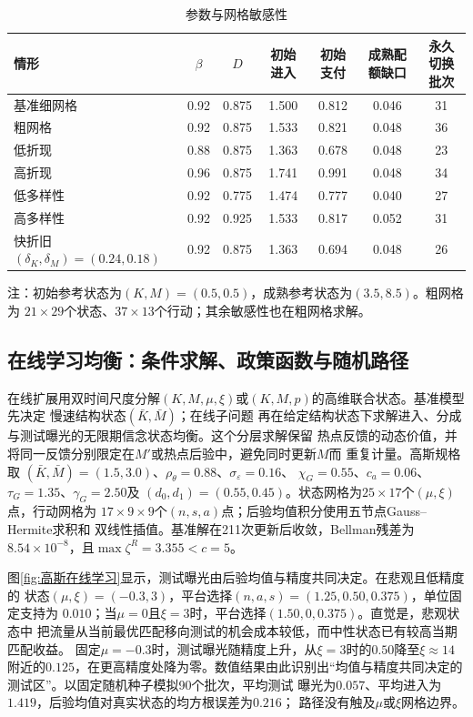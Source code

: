 \documentclass[UTF8, a4paper, 12pt, fontset=fandol]{ctexart}
\theoremstyle{definition}
\theoremstyle{remark}
\begin{document}
\begin{table}[H]
  \centering
  \scriptsize
  \caption{参数与网格敏感性}
  \label{tab:数值稳健性}
  \begin{tabular}{lcccccc}
    \toprule
    情形 & $\beta$ & $D$ & 初始进入 & 初始支付 & 成熟配额缺口 & 永久切换批次 \\
    \midrule
    基准细网格 & 0.92 & 0.875 & 1.500 & 0.812 & 0.046 & 31 \\
    粗网格 & 0.92 & 0.875 & 1.533 & 0.821 & 0.048 & 36 \\
    低折现 & 0.88 & 0.875 & 1.363 & 0.678 & 0.048 & 23 \\
    高折现 & 0.96 & 0.875 & 1.741 & 0.991 & 0.048 & 34 \\
    低多样性 & 0.92 & 0.775 & 1.474 & 0.777 & 0.040 & 27 \\
    高多样性 & 0.92 & 0.925 & 1.533 & 0.817 & 0.052 & 31 \\
    快折旧$(\delta_K,\delta_M)=(0.24,0.18)$ & 0.92 & 0.875 & 1.363 & 0.694 & 0.048 & 26 \\
    \bottomrule
  \end{tabular}
  \begin{minipage}{0.96\textwidth}
    \footnotesize\raggedright
    注：初始参考状态为$(K,M)=(0.5,0.5)$，成熟参考状态为$(3.5,8.5)$。粗网格为
    $21\times29$个状态、$37\times13$个行动；其余敏感性也在粗网格求解。
  \end{minipage}
\end{table}

\subsection{在线学习均衡：条件求解、政策函数与随机路径}

在线扩展用双时间尺度分解$(K,M,\mu,\xi)$或$(K,M,p)$的高维联合状态。基准模型先决定
慢速结构状态$(\bar K,\bar M)$；在线子问题
再在给定结构状态下求解进入、分成与测试曝光的无限期信念状态均衡。这个分层求解保留
热点反馈的动态价值，并将同一反馈分别限定在$M'$或热点后验中，避免同时更新$M$而
重复计量。高斯规格取
$(\bar K,\bar M)=(1.5,3.0)$、$\rho_\theta=0.88$、$\sigma_\varepsilon=0.16$、
$\chi_G=0.55$、$c_a=0.06$、$\tau_G=1.35$、$\gamma_G=2.50$及
$(d_0,d_1)=(0.55,0.45)$。状态网格为$25\times17$个$(\mu,\xi)$点，行动网格为
$17\times9\times9$个$(n,s,a)$点；后验均值积分使用五节点Gauss--Hermite求积和
双线性插值。基准解在211次更新后收敛，Bellman残差为
$8.54\times10^{-8}$，且$\max\zeta^R=3.355<c=5$。

图\ref{fig:高斯在线学习}显示，测试曝光由后验均值与精度共同决定。在悲观且低精度的
状态$(\mu,\xi)=(-0.3,3)$，平台选择$(n,a,s)=(1.25,0.50,0.375)$，单位固定支持为
$0.010$；当$\mu=0$且$\xi=3$时，平台选择$(1.50,0,0.375)$。直觉是，悲观状态中
把流量从当前最优匹配移向测试的机会成本较低，而中性状态已有较高当期匹配收益。
固定$\mu=-0.3$时，测试曝光随精度上升，从$\xi=3$时的$0.50$降至$\xi\approx14$
附近的$0.125$，在更高精度处降为零。数值结果由此识别出“均值与精度共同决定的
测试区”。以固定随机种子模拟90个批次，平均测试
曝光为$0.057$、平均进入为$1.419$，后验均值对真实状态的均方根误差为$0.216$；
路径没有触及$\mu$或$\xi$网格边界。
\end{document}
